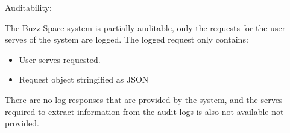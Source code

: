 \item Auditability:

The Buzz Space system is partially auditable, only the requests for the user serves of the system are logged. The logged request only contains:
\begin{itemize}
\item User serves requested.
\item Request object stringified as JSON
\end{itemize}

There are no log responses that are provided by the system, and the serves required to extract information from the audit logs is also not available not provided.
